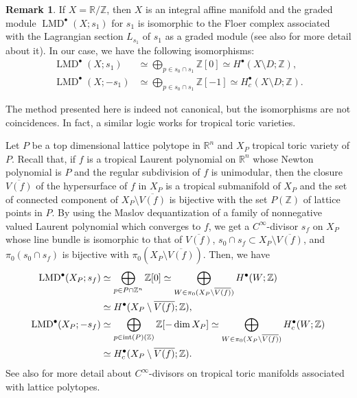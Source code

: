 \documentclass[a4paper,dvipdfmx,reqno,12pt]{amsart}
\theoremstyle{definition}
\newtheorem{remark}[theorem]{Remark}
\newcommand{\opn}[1]{\operatorname{#1}}
\numberwithin{equation}{section}
\begin{document}
\begin{remark}
If $X=\mathbb{R}/\mathbb{Z}$, then 
$X$ is an integral affine manifold and  
the graded module $\opn{LMD}^{\bullet}(X;s_{1})$
for $s_{1}$ is isomorphic to the Floer complex
associated with the Lagrangian section $L_{s_{1}}$
of $s_{1}$ \cite[Remark 13]{MR1882331} as a graded
module (see also \cite[]{tsutsui2023graded}
for more detail about it). In our case, we have 
the following isomorphisms:
\begin{align}
\opn{LMD}^{\bullet}(X;s_{1}) &\simeq 
\bigoplus_{p\in s_0\cap s_{1}}\mathbb{Z}[0]
\simeq H^{\bullet}(X\setminus D;\mathbb{Z}), \\
\opn{LMD}^{\bullet}(X;-s_{1}) &\simeq
\bigoplus_{p\in s_0\cap s_{1}}\mathbb{Z}[-1]
\simeq H^{\bullet}_c(X\setminus D;\mathbb{Z}).
\end{align}




The method presented here is indeed not canonical,
but the isomorphisms are not coincidences. In fact, 
a similar logic works for tropical toric varieties.


Let $P$ be a top dimensional lattice polytope
in $\mathbb{R}^{n}$ and $X_P$ tropical toric variety
of $P$. Recall that,
if $f$ is a tropical Laurent polynomial on 
$\mathbb{R}^{n}$ 
whose Newton polynomial is $P$ and the regular
subdivision of $f$ is unimodular, then the closure
$\overline{V(f)}$ of
the hypersurface of $f$ in $X_P$ is a tropical submanifold
of $X_P$ and the set of connected component of 
$X_P\setminus \overline{V(f)}$ is bijective with the set $P(\mathbb{Z})$
of lattice points in $P$.
By using the Maslov dequantization 
of a family of nonnegative valued Laurent polynomial
which converges to $f$, we get a 
$C^{\infty}$-divisor $s_f$ on $X_P$ whose line bundle is
isomorphic to that of $\overline{V(f)}$, 
$s_0\cap s_{f}\subset X_P\setminus \overline{V(f)}$,
and $\pi_0(s_0\cap s_{f})$ is bijective with 
$\pi_0(X_P\setminus \overline{V(f)})$.
Then, we have
\begin{align}
\opn{LMD}^{\bullet}(X_P;s_{f})
&\simeq \bigoplus_{p\in P\cap \mathbb{Z}^{n}}\mathbb{Z}[0]
\simeq \bigoplus_{W\in \pi_0(X_P\setminus \overline{V(f)})}
H^{\bullet}(W;\mathbb{Z}) \notag \\
&\simeq H^{\bullet}(X_P\setminus \overline{V(f)};\mathbb{Z}), \\
\opn{LMD}^{\bullet}(X_P;-s_{f})
&\simeq \bigoplus_{p\in \opn{int}(P)(\mathbb{Z})}
\mathbb{Z}[-\dim X_P]
\simeq \bigoplus_{W\in \pi_0(X_P\setminus \overline{V(f)})}
H^{\bullet}_c(W;\mathbb{Z}) \notag \\
&\simeq H^{\bullet}_c(X_P\setminus \overline{V(f)};\mathbb{Z}).
\end{align}
See also \cite[Appendix D]{tsutsui2023graded}
for more detail about $C^{\infty}$-divisors on
tropical toric manifolds associated with lattice polytopes.


\end{remark}
\end{document}
